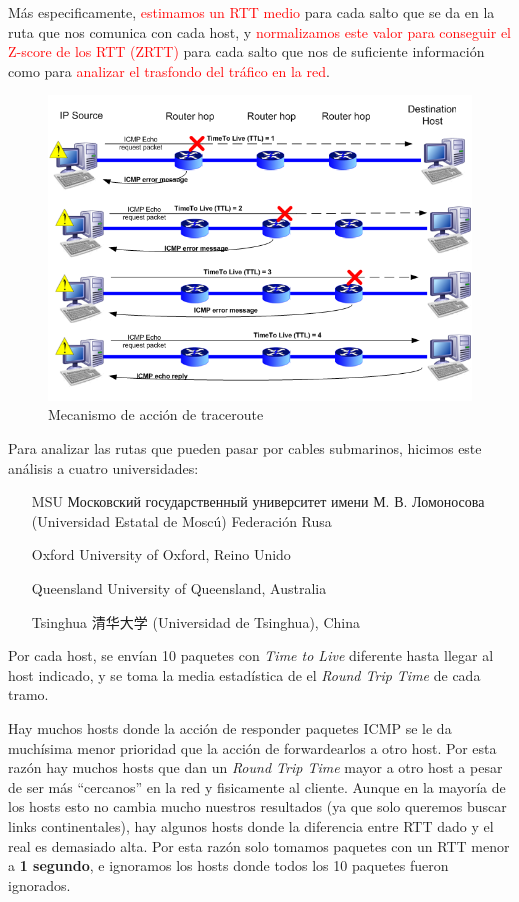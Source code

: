Más especificamente, \textcolor{red}{estimamos un RTT medio} para cada salto que
se da en la ruta que nos comunica con cada host, y \textcolor{red}{normalizamos
este valor para conseguir el Z-score de los RTT (ZRTT)} para cada salto que nos
de suficiente informaci\'on como para \textcolor{red}{analizar el trasfondo del
tr\'afico en la red}.

\begin{figure}[!h]
  \begin{center}
      \includegraphics[scale=0.4]{imagenes/traceroute.png}
      \caption{Mecanismo de acción de traceroute}
      \label{fig:contra1}
  \end{center}
\end{figure}

Para analizar las rutas que pueden pasar por cables submarinos, hicimos este
an\'alisis a cuatro universidades:

\begin{itemize}
	\item [MSU] {\foreignlanguage{russian}{Московский государственный
	университет имени М. В. Ломоносова}
	(Universidad Estatal de Mosc\'u) Federaci\'on Rusa}
	\item [Oxford] {University of Oxford, Reino Unido}
	\item [Queensland] {University of Queensland, Australia}
	\item [Tsinghua] {\foreignlanguage{chinese}{清华大学} (Universidad de Tsinghua), China}
\end{itemize}

Por cada host, se env\'ian 10 paquetes con \textit{Time to Live} diferente hasta
llegar al host indicado, y se toma la media estad\'istica de el \textit{Round
Trip Time} de cada tramo.

Hay muchos hosts donde la acci\'on de responder paquetes ICMP se le da
much\'isima menor prioridad que la acci\'on de forwardearlos a otro host. Por
esta raz\'on hay muchos hosts que dan un \textit{Round Trip Time} mayor a otro
host a pesar de ser m\'as ``cercanos'' en la red y fisicamente al cliente.
Aunque en la mayor\'ia de los hosts esto no cambia mucho nuestros resultados (ya que
solo queremos buscar links continentales), hay algunos hosts donde la diferencia
entre RTT dado y el real es demasiado alta. Por esta raz\'on solo tomamos
paquetes con un RTT menor a \textbf{1 segundo}, e ignoramos los hosts donde
todos los 10 paquetes fueron ignorados.
